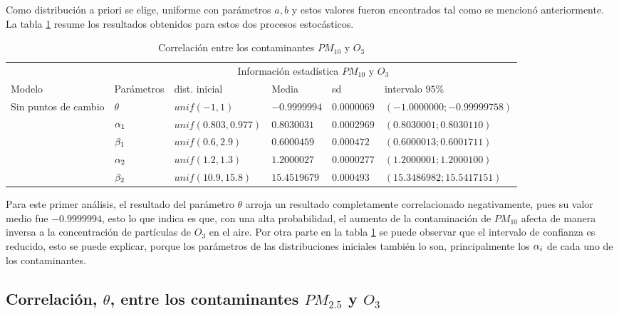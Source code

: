 Como distribución a priori se elige, uniforme con parámetros $a,b$ y estos valores fueron encontrados tal como se mencionó anteriormente. La tabla \ref{infoestad_PM10_Oz} resume los resultados obtenidos para estos dos procesos estocásticos. 
\begin{table}[!h]
\centering
\begin{tabular}{|l|l|l|l|l|l|}
\hline
& \multicolumn{5}{c|}{Información estadística $PM_{10}$ y $O_3$ } \\
\cline{2-6}
Modelo & Parámetros & dist. inicial  & Media & sd  &   intervalo $95 \%$\\
\hline \hline
\multirow{5}{1.5cm}{Sin puntos de cambio }  & $\theta$ & $unif(-1,1)$ & $-0.9999994$ & $0.0000069$ & $(-1.0000000;-0.99999758 )$ \\ \cline{2-6}
& $\alpha_1$& $unif(0.803,0.977)$ & $0.8030031$ & $0.0002969$ & $( 0.8030001;0.8030110)$\\  \cline{2-6}
& $\beta_1$& $unif(0.6,2.9)$ & $0.6000459$ & $0.000472$ & $(0.6000013;0.6001711)$\\  \cline{2-6}
& $\alpha_2$& $unif(1.2,1.3)$ & $1.2000027$ & $0.0000277$ & $(1.2000001;1.2000100)$\\  \cline{2-6}
& $\beta_2$& $unif(10.9,15.8)$ & $15.4519679$ & $0.000493$ & $(15.3486982;15.5417151)$\\  \cline{1-6}
\end{tabular}
\caption{Correlación entre los contaminantes $PM_{10}$ y $O_3$  }
\label{infoestad_PM10_Oz}
\end{table}

Para este primer análisis, el resultado del parámetro $\theta$ arroja un resultado completamente correlacionado negativamente, pues su valor medio fue $-0.9999994$, esto lo que indica es que, con una alta probabilidad, el aumento de la contaminación de $PM_{10}$ afecta de manera inversa a la concentración de partículas de $O_3$ en el aire. 
Por otra parte en la tabla \ref{infoestad_PM10_Oz} se puede observar que el intervalo de confianza es reducido, esto se puede explicar, porque los parámetros de las distribuciones iniciales también lo son, principalmente los $\alpha_i$ de cada uno de los contaminantes. 



\newpage
\subsection{Correlación, $\theta$, entre los contaminantes $PM_{2.5}$ y $O_3$ }

